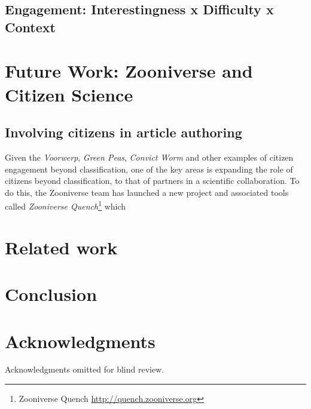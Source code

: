 \documentclass{sigchi}
\begin{document}
\subsection{Engagement: Interestingness x Difficulty x Context}

\section{Future Work: Zooniverse and Citizen Science}

\subsection{Involving citizens in article authoring}

Given the \emph{Voorwerp}, \emph{Green Peas}, \emph{Convict Worm} and other examples of citizen engagement beyond classification, one of the key areas is expanding the role of citizens beyond classification, to that of partners in a scientific collaboration.  To do this, the Zooniverse team has launched a new project and associated tools called \emph{Zooniverse Quench}\footnote{Zooniverse Quench \url{http://quench.zooniverse.org}} which 



\section{Related work}

\section{Conclusion}

\section{Acknowledgments}
Acknowledgments omitted for blind review.
\end{document}
